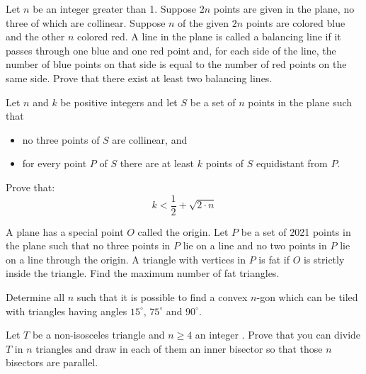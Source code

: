 \documentclass[11pt]{scrartcl}
\begin{document}
\begin{problem} [USAMO 2005/5]
    Let $n$ be an integer greater than 1. Suppose $2n$ points are given in the plane, no three of which are collinear. Suppose $n$ of the given $2n$ points are colored blue and the other $n$ colored red. A line in the plane is called a balancing line if it passes through one blue and one red point and, for each side of the line, the number of blue points on that side is equal to the number of red points on the same side.
Prove that there exist at least two balancing lines.
\end{problem}

\begin{problem} [IMO 1989/3]
    Let $ n$ and $ k$ be positive integers and let $ S$ be a set of $ n$ points in the plane such that
\begin{itemize}
   
\item no three points of $ S$ are collinear, and

\item for every point $ P$ of $ S$ there are at least $ k$ points of $ S$ equidistant from $ P.$
 
\end{itemize}
Prove that:
\[ k < \frac {1}{2} + \sqrt {2 \cdot n}
\]
\end{problem}

\begin{problem} [EGMO 2021/5]
    A plane has a special point $O$ called the origin. Let $P$ be a set of 2021 points in the plane such that
no three points in $P$ lie on a line and
no two points in $P$ lie on a line through the origin.
A triangle with vertices in $P$ is fat if $O$ is strictly inside the triangle. Find the maximum number of fat triangles.
\end{problem}

\begin{problem} [IMSC 2025/4]
    Determine all $n$ such that it is possible to find a convex $n$-gon which can be tiled with triangles having angles $15^\circ$, $75^\circ$ and $90^\circ$.
\end{problem}

\begin{problem} [Rioplantese 2012/3]
    	Let $T$ be a non-isosceles triangle and $n \ge 4$ an integer . Prove that you can divide $T$ in $n$ triangles and draw in each of them an inner bisector so that those $n$ bisectors are parallel.
\end{problem}
\end{document}
